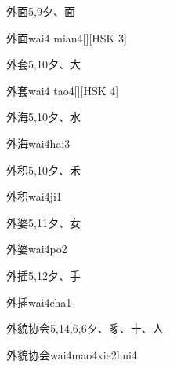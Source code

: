\begin{entry}{外面}{5,9}{⼣、⾯}
  \begin{phonetics}{外面}{wai4 mian4}[][HSK 3]
  \end{phonetics}
\end{entry}

\begin{entry}{外套}{5,10}{⼣、⼤}
  \begin{phonetics}{外套}{wai4 tao4}[][HSK 4]
  \end{phonetics}
\end{entry}

\begin{entry}{外海}{5,10}{⼣、⽔}
  \begin{phonetics}{外海}{wai4hai3}
  \end{phonetics}
\end{entry}

\begin{entry}{外积}{5,10}{⼣、⽲}
  \begin{phonetics}{外积}{wai4ji1}
  \end{phonetics}
\end{entry}

\begin{entry}{外婆}{5,11}{⼣、⼥}
  \begin{phonetics}{外婆}{wai4po2}
  \end{phonetics}
\end{entry}

\begin{entry}{外插}{5,12}{⼣、⼿}
  \begin{phonetics}{外插}{wai4cha1}
  \end{phonetics}
\end{entry}

\begin{entry}{外貌协会}{5,14,6,6}{⼣、⾘、⼗、⼈}
  \begin{phonetics}{外貌协会}{wai4mao4xie2hui4}
  \end{phonetics}
\end{entry}


